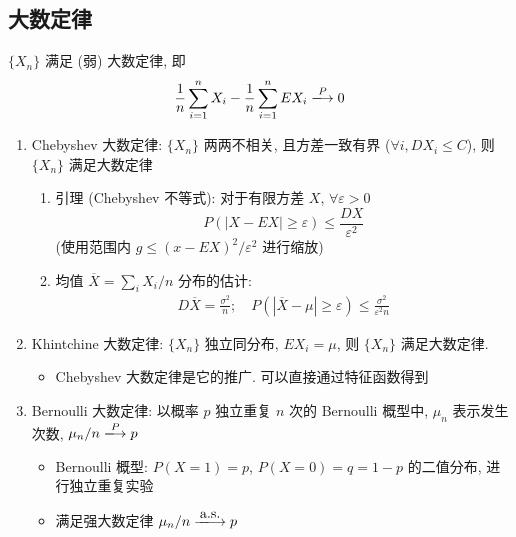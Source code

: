 \documentclass[11pt,a4paper,twocolumn]{article} %
\numberwithin{equation}{section} %
\begin{document}
\subsection{大数定律} %
$\{X_n\}$ 满足 (弱) 大数定律, 即
\begin{equation}
	\frac 1n\sum_{i=1}^n X_i - \frac 1n \sum_{i=1}^n EX_i \xlongrightarrow{P} 0
\end{equation}
\label{sub:large_num}
\begin{enumerate}
	\item Chebyshev 大数定律: $\{X_n\}$ 两两不相关, 且方差一致有界 
	($\forall i, DX_i\le C$), 则 $\{X_n\}$ 满足大数定律
	\begin{enumerate}
		\item 引理 (Chebyshev 不等式): 对于有限方差 $X$, 
		$\forall \varepsilon > 0$
		\begin{equation}
			P\left(|X - EX|\ge \varepsilon\right)\le \frac{DX}{\varepsilon^2}
		\end{equation}
		(使用范围内 $g\le (x-EX)^2/\varepsilon^2$ 进行缩放)
		\item 均值 $\overline X = \sum_i X_i / n$ 分布的估计: 
		\begin{align}
			D\overline X = \frac{\sigma^2}{n}; \quad
			P(|\overline X - \mu|\ge \varepsilon) \le 
			\frac{\sigma^2}{\varepsilon^2 n}
		\end{align}
	\end{enumerate}
	\item Khintchine 大数定律: $\{X_n\}$ 独立同分布, $EX_i = \mu$, 
	则 $\{X_n\}$ 满足大数定律. 
	\begin{itemize}
		\item Chebyshev 大数定律是它的推广. 可以直接通过特征函数得到
	\end{itemize}
	\item Bernoulli 大数定律: 以概率 $p$ 独立重复 $n$ 次的 Bernoulli 概型中, 
	$\mu_n$ 表示发生次数, $\mu_n/n\xlongrightarrow{P}p$
	\begin{itemize}
		\item Bernoulli 概型: $P(X = 1)=p$, $P(X=0) = q=1-p$ 的二值分布, 
		进行独立重复实验
		\item 满足强大数定律 $\mu_n/n\xlongrightarrow{\mbox{a.s.}}p$
	\end{itemize}
\end{enumerate}
\end{document}
